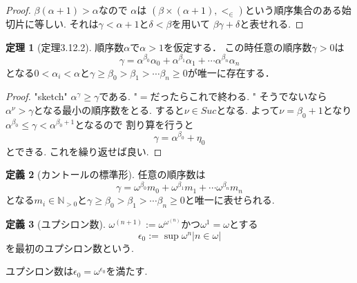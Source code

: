 \documentclass[dvipdfmx,a4paper,11pt]{report}
\newcommand{\N}{\mathbb{N}}
\theoremstyle{definition}
\newtheorem{thm}{定理}
\newtheorem{dfn}[thm]{定義}
\begin{document}
\begin{proof}
$\beta(\alpha + 1) > \alpha$なので
$\alpha$は
$(\beta \times (\alpha+1), <_{\in})$という順序集合のある始切片に等しい.
それは$\gamma < \alpha + 1$と$\delta < \beta$を用いて
$\beta \gamma + \delta$と表せれる. 
\end{proof}

 \begin{tcolorbox}
 [colback = white, colframe = green!35!black, fonttitle = \bfseries,breakable = true]
\begin{thm}[定理3.12.2]
順序数$\alpha$で$\alpha>1$を仮定する．
この時任意の順序数$\gamma >0$は
$$
\gamma = \alpha^{\beta_0}\alpha_{0} +  \alpha^{\beta_1}\alpha_{1} +\cdots \alpha^{\beta_n}\alpha_{n}
$$
となる$0 < \alpha_i < \alpha$と$\gamma \ge \beta_{0}>\beta_1>\cdots \beta_{n} \ge 0$が唯一に存在する． 
\end{thm}
\end{tcolorbox}

\begin{proof}
"sketch" $\alpha^{\gamma}\ge \gamma$である. "$=$だったらこれで終わる. "
そうでないなら$\alpha^{\nu} > \gamma$となる最小の順序数をとる. すると$\nu \in Suc$となる.
よって$\nu = \beta_0 +1$となり
$\alpha^{\beta_0} \le \gamma < \alpha^{\beta_0 +1}$となるので
割り算を行うと
$$
\gamma = \alpha^{\beta_0} +  \eta_{0}
$$
とできる. これを繰り返せば良い. 
\end{proof}

 \begin{tcolorbox}
 [colback = white, colframe = green!35!black, fonttitle = \bfseries,breakable = true]
\begin{dfn}[カントールの標準形]
任意の順序数は
$$
\gamma = 
\omega^{\beta_0}m_{0} +  \omega^{\beta_1}m_{1} +\cdots \omega^{\beta_n}m_{n}
$$
となる$m_i \in \N_{>0}$と$\gamma \ge \beta_{0}>\beta_1>\cdots \beta_{n} \ge 0$と唯一に表せられる. 
\end{dfn}
\end{tcolorbox}

 \begin{tcolorbox}
 [colback = white, colframe = green!35!black, fonttitle = \bfseries,breakable = true]
\begin{dfn}[ユプシロン数]
$\omega^{(n+1)}:=\omega^{\omega^{(n)}}$かつ$\omega^{1}=\omega$とする
$$
\epsilon_0 := \sup{ \omega^{n} | n \in \omega|}
$$
を最初のユプシロン数という. 
\end{dfn}
ユプシロン数は$\epsilon_0 = \omega^{\epsilon_0 }$を満たす. 
\end{tcolorbox}
\end{document}
